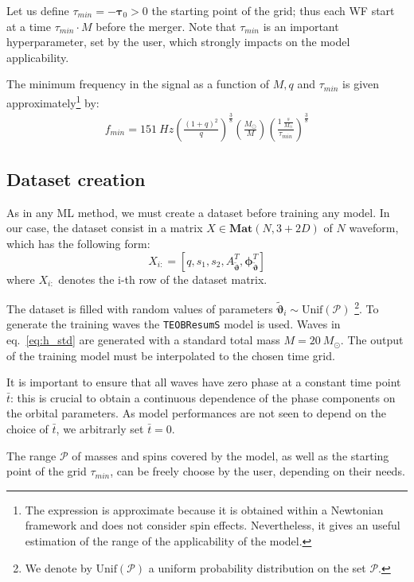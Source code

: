 Let us define $\tau_{min} = -{\boldsymbol{\tau}}_0 > 0 $ the starting point of the grid; thus each WF start at a time $\tau_{min}\cdot M$ before the merger.
Note that $\tau_{min}$ is an important hyperparameter, set by the user, which strongly impacts on the model applicability.
\par
The minimum frequency in the signal as a function of $M, q$ and $\tau_{min}$ is given approximately\footnote{The expression is approximate because it is obtained within a Newtonian framework and does not consider spin effects.
Nevertheless, it gives an useful estimation of the range of the applicability of the model.}
by:
\begin{align}\label{eq:f_min}
	f_{min} = \SI{151}{Hz}  \left( \frac{(1+q)^2}{q} \right)^{\frac{3}{8}}  \left( \frac{M_\odot}{M} \right)  \left(\frac{\SI{1}{ \frac{s}{M_\odot}}}{\tau_{min}} \right)^{\frac{3}{8}}  
\end{align} 


\subsection{Dataset creation}
\label{sec:trainingset}
As in any ML method, we must create a dataset before training any model.
In our case, the dataset consist in a matrix ${X \in \mathbf{Mat}(N,3+2D)}$ of $N$ waveform, which has the following form:
\begin{equation} \label{eq:dataset}
	X_{i:} = [q,s_1,s_2, {A}_{{\tilde{\boldsymbol{\vartheta}}}}^T, \boldsymbol{\phi}_{{\tilde{\boldsymbol{\vartheta}}}}^T]
\end{equation}
where $X_{i:}$ denotes the i-th row of the dataset matrix.
\par
The dataset is filled with random values of parameters ${\tilde{\boldsymbol{\vartheta}}}_i \sim \textrm{Unif}(\mathcal{P})$
\footnote{We denote by $\textrm{Unif}(\mathcal{P})$ a uniform probability distribution on the set $\mathcal{P}$.}.
To generate the training waves the \texttt{TEOBResumS} model is used.
Waves in eq.~\eqref{eq:h_std} are generated with a standard total mass
$M = \SI{20}{M_\odot}$.
The output of the training model must be interpolated to the chosen time grid.
\par
It is important to ensure that all waves have zero phase at a constant
time point $\bar{t}$: this is crucial to obtain a continuous
dependence of the phase components on the orbital parameters. As model
performances are not seen to depend on the choice of
$\bar{t}$, we arbitrarly set $\bar{t} = 0$.
\par
The range $\mathcal{P}$ of masses and spins covered by the model, as well as the starting point of the grid $\tau_{min}$, can be freely choose by the user, depending on their needs.


